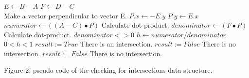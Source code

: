 \documentclass[a4paper,twoside,10pt]{article}
\begin{document}
\thispagestyle{empty}
\begin{codebox}
\li $E \gets B-A$
\li $F \gets D-C$\\
    \Comment Make a vector perpendicular to vector E.
\li $P.x \gets -E.y$
\li $P.y \gets E.x$
\li $numerator \gets ((A-C) \bullet P)$ \Comment Calculate dot-product.
\li $denominator \gets (F \bullet P)$ \Comment Calculate dot-product.
\li \If     $denominator <> 0$
\li \Then   $h \gets numerator / denominator$
\li         \If     $0 < h < 1$
\li         \Then   $result := True$ \Comment There is an intersection.
\li         \Else   $result := False$ \Comment There is no intersection.
            \End
\li \Else   $result := False$ \Comment There is no intersection.
    \End
\end{codebox}

Figure 2: pseudo-code of the checking for intersections data structure.
\end{document}
